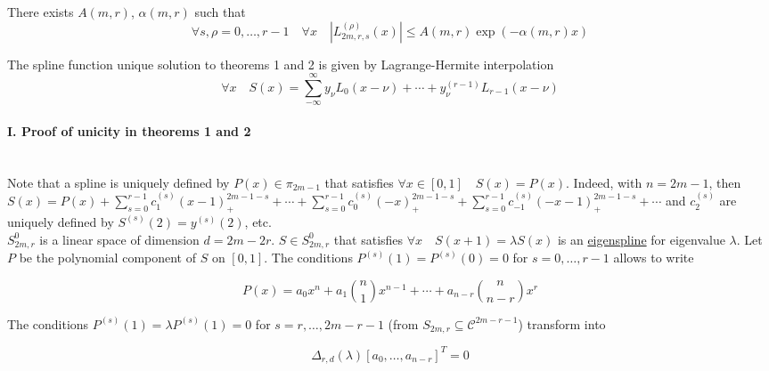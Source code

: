 \documentclass[a4paper, 11pt]{article}
\begin{document}
\begin{thm}{3}
  There exists $A(m,r)$, $\alpha(m,r)$ such that
  \begin{equation}
  \forall s, \rho = 0, \ldots, r-1 \quad \forall x \quad  |L_{2m, r, s}^{(\rho)}(x)| \leq A(m,r) \exp(-\alpha(m,r)x)
  \end{equation}
\end{thm}

\begin{thm}{4}
  The spline function unique solution to theorems 1 and 2 is given by Lagrange-Hermite interpolation
  \begin{equation}
    \forall x \quad S(x) = \sum_{-\infty}^{\infty} y_{\nu} L_0(x-\nu) + \cdots + y^{(r-1)}_{\nu} L_{r-1}(x-\nu)
  \end{equation}
\end{thm}

\paragraph{I\@. Proof of unicity in theorems 1 and 2} \mbox{} \\

Note that a spline is uniquely defined by $P(x) \in \pi_{2m-1}$ that satisfies $\forall x \in [0, 1] \quad S(x) = P(x)$.  
Indeed, with $n = 2m-1$, then $\displaystyle S(x) = P(x) + \sum_{s=0}^{r-1} c_1^{(s)} {(x-1)}_+^{2m-1-s} + \cdots + 
\sum_{s=0}^{r-1} c_0^{(s)} {(-x)}_+^{2m-1-s} + \sum_{s=0}^{r-1} c_{-1}^{(s)} {(-x-1)}_+^{2m-1-s} + \cdots$ and 
$c_2^{(s)}$ are uniquely defined by $S^{(s)}(2) = y^{(s)}(2)$, etc.\\

$S^0_{2m, r}$ is a linear space of dimension $d=2m-2r$. $S \in S^0_{2m, r}$ that satisfies $\forall x \quad S(x+1) = 
\lambda S(x)$ is an \underline{eigenspline} for eigenvalue $\lambda$. Let $P$ be the polynomial component of $S$ on 
$[0,1]$. The conditions $P^{(s)}(1) = P^{(s)}(0) = 0$ for $s=0, \ldots, r-1$ allows to write
    
\begin{equation}
P(x) = a_0 x^n + a_1 \binom{n}{1} x^{n-1} + \cdots + a_{n-r} \binom{n}{n-r} x^r
\end{equation}

The conditions $P^{(s)}(1) = \lambda P^{(s)}(1) = 0$ for $s=r, \ldots, 2m-r-1$ (from $S_{2m,r} \subseteq 
\mathcal{C}^{2m-r-1}$) transform into 

\begin{equation}
  \Delta_{r,d}(\lambda) {[a_0, \ldots, a_{n-r}]}^T = 0
\end{equation}
\end{document}
